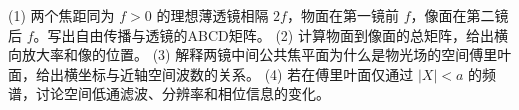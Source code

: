 (1) 两个焦距同为 \(f>0\) 的理想薄透镜相隔 \(2f\)，物面在第一镜前 \(f\)，像面在第二镜后 \(f\)。写出自由传播与透镜的ABCD矩阵。
(2) 计算物面到像面的总矩阵，给出横向放大率和像的位置。
(3) 解释两镜中间公共焦平面为什么是物光场的空间傅里叶面，给出横坐标与近轴空间波数的关系。
(4) 若在傅里叶面仅通过 \(|X|<a\) 的频谱，讨论空间低通滤波、分辨率和相位信息的变化。
